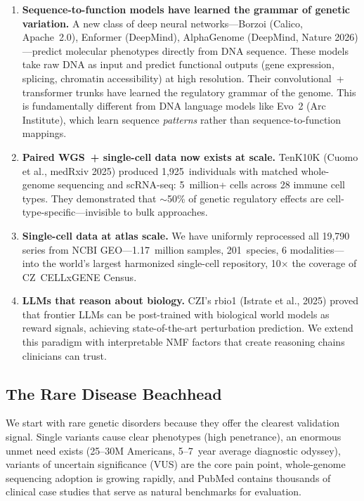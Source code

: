 \documentclass[10pt,twocolumn,letterpaper]{article}
\begin{document}
\begin{enumerate}
  \item \textbf{Sequence-to-function models have learned the grammar of genetic
    variation.} A new class of deep neural networks---Borzoi (Calico, Apache~2.0),
    Enformer (DeepMind), AlphaGenome (DeepMind, Nature 2026)---predict molecular
    phenotypes directly from DNA sequence. These models take raw DNA as input and
    predict functional outputs (gene expression, splicing, chromatin accessibility)
    at high resolution. Their convolutional~+ transformer trunks have learned the
    regulatory grammar of the genome. This is fundamentally different from DNA
    language models like Evo~2 (Arc Institute), which learn sequence
    \emph{patterns} rather than sequence-to-function mappings.

  \item \textbf{Paired WGS~+ single-cell data now exists at scale.} TenK10K
    (Cuomo et al., medRxiv 2025) produced 1,925~individuals with matched
    whole-genome sequencing and scRNA-seq: 5~million+ cells across 28 immune cell
    types. They demonstrated that $\sim$50\% of genetic regulatory effects are
    cell-type-specific---invisible to bulk approaches.

  \item \textbf{Single-cell data at atlas scale.} We have uniformly reprocessed all
    19,790 series from NCBI GEO---1.17~million samples, 201~species, 6
    modalities---into the world's largest harmonized single-cell repository, 10$\times$
    the coverage of CZ~CELLxGENE Census.

  \item \textbf{LLMs that reason about biology.} CZI's rbio1 (Istrate et al., 2025)
    proved that frontier LLMs can be post-trained with biological world models as
    reward signals, achieving state-of-the-art perturbation prediction. We extend
    this paradigm with interpretable NMF factors that create reasoning chains
    clinicians can trust.
\end{enumerate}

\subsection{The Rare Disease Beachhead}

We start with rare genetic disorders because they offer the clearest validation
signal. Single variants cause clear phenotypes (high penetrance), an enormous
unmet need exists (25--30M Americans, 5--7~year average diagnostic odyssey),
variants of uncertain significance (VUS) are the core pain point, whole-genome
sequencing adoption is growing rapidly, and PubMed contains thousands of clinical
case studies that serve as natural benchmarks for evaluation.
\end{document}
